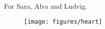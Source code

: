 
\vspace{4cm}
For Sara, Alva and Ludvig.

\begin{figure}[h]
\begin{flushright}
  \texttt{[image: figures/heart]}
 \end{flushright}
\end{figure}

